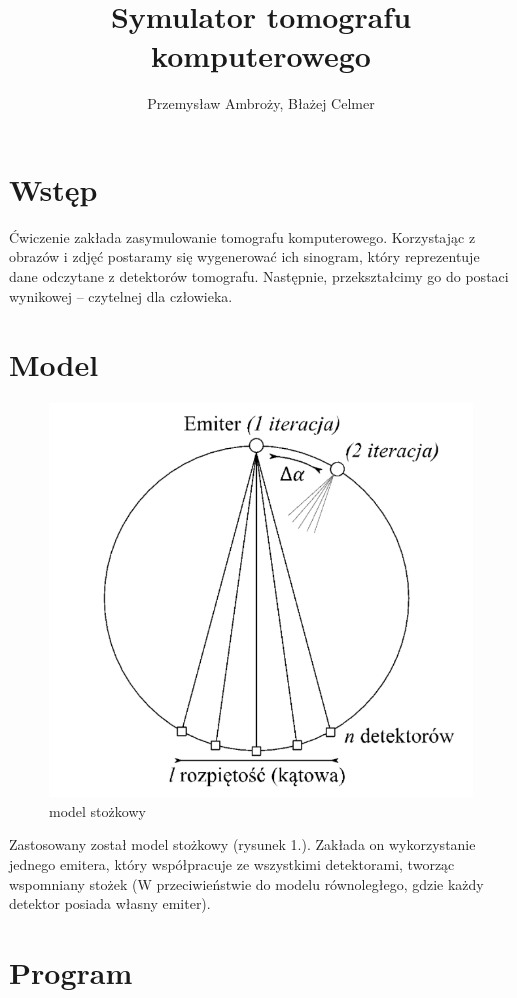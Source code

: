\documentclass[polish,polish,a4paper]{article}
\title{Symulator tomografu komputerowego}
\author{Przemysław Ambroży, Błażej Celmer}
\begin{document}
 
	\maketitle
	
	\section{Wstęp}
		Ćwiczenie zakłada zasymulowanie tomografu komputerowego. 
		Korzystając z obrazów i zdjęć postaramy się wygenerować ich sinogram, 
		który reprezentuje dane odczytane z detektorów tomografu.
		Następnie, przekształcimy go do postaci wynikowej -- czytelnej dla człowieka.
 	
	\section{Model}
			\begin{figure}[h]
				\centering
				\includegraphics[scale=0.7]{img/model.png}
				\caption{model stożkowy}
			\end{figure}
		Zastosowany został model stożkowy (rysunek 1.).
		 Zakłada on wykorzystanie jednego emitera,
		  który współpracuje ze wszystkimi detektorami, tworząc wspomniany stożek 
		  (W przeciwieństwie do modelu równoległego, gdzie każdy detektor posiada własny emiter).
		
	\section{Program}
\end{document}
